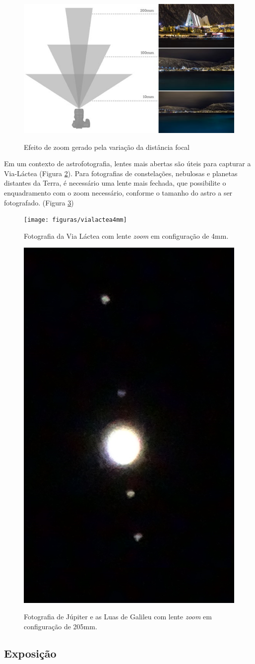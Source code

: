 \begin{figure}[htb]
	\centering
	\caption{Efeito de zoom gerado pela variação da distância focal}
	\includegraphics[width=0.7\linewidth]{figuras/claudia-distanciafocal}
	\label{fig:focaldistance}
\end{figure}

Em um contexto de astrofotografia, lentes mais abertas são úteis para capturar a Via-Láctea (Figura \ref{fig:vialactea4mmSony}). Para fotografias de constelações, nebulosas e planetas distantes da Terra, é necessário uma lente mais fechada, que possibilite o enquadramento com o zoom necessário, conforme o tamanho do astro a ser fotografado. (Figura \ref{fig:jupiterSony})

\begin{figure}[!htb]
	\centering
	\caption{Fotografia da Via Láctea com lente \textit{zoom} em configuração de 4mm.}
	\texttt{[image: figuras/vialactea4mm]}
	\label{fig:vialactea4mmSony}
\end{figure}

\begin{figure}[!htb]
	\centering
	\caption{Fotografia de Júpiter e as Luas de Galileu com lente \textit{zoom} em configuração de 205mm.}
	\includegraphics[width=0.2\linewidth]{figuras/jupiter205mm_Luas}
	\label{fig:jupiterSony}
\end{figure}

\subsection{Exposição}

